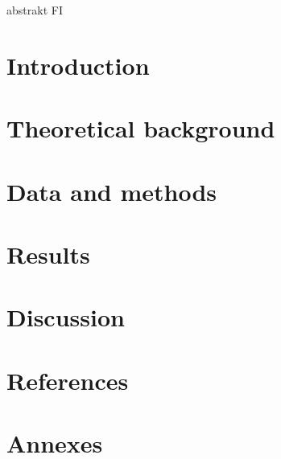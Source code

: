 \documentclass[a4paper,11pt]{article}
\begin{document}
\newpage
abstrakt FI

\newpage
\tableofcontents

\newpage
\section{Introduction}

\newpage
\section{Theoretical background}

\newpage
\section{Data and methods}

\newpage
\section{Results}

\newpage
\section{Discussion}

\newpage
\section{References}
\renewcommand{\refname}{}


\newpage
\section{Annexes}
\end{document}
